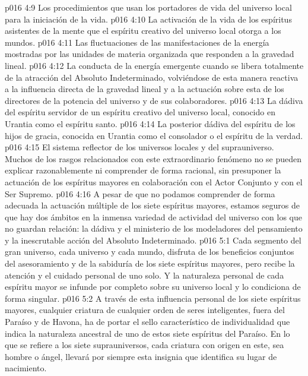 \vs p016 4:9 Los procedimientos que usan los portadores de vida del universo local para la iniciación de la vida.
\vs p016 4:10 La activación de la vida de los espíritus asistentes de la mente que el espíritu creativo del universo local otorga a los mundos.
\vs p016 4:11 Las fluctuaciones de las manifestaciones de la energía mostradas por las unidades de materia organizada que responden a la gravedad lineal.
\vs p016 4:12 La conducta de la energía emergente cuando se libera totalmente de la atracción del Absoluto Indeterminado, volviéndose de esta manera reactiva a la influencia directa de la gravedad lineal y a la actuación sobre esta de los directores de la potencia del universo y de sus colaboradores.
\vs p016 4:13 La dádiva del espíritu servidor de un espíritu creativo del universo local, conocido en Urantia como el espíritu santo.
\vs p016 4:14 La posterior dádiva del espíritu de los hijos de gracia, conocida en Urantia como el consolador o el espíritu de la verdad.
\vs p016 4:15 El sistema reflector de los universos locales y del suprauniverso. Muchos de los rasgos relacionados con este extraordinario fenómeno no se pueden explicar razonablemente ni comprender de forma racional, sin presuponer la actuación de los espíritus mayores en colaboración con el Actor Conjunto y con el Ser Supremo.
\vs p016 4:16 \pc A pesar de que no podamos comprender de forma adecuada la actuación múltiple de los siete espíritus mayores, estamos seguros de que hay dos ámbitos en la inmensa variedad de actividad del universo con los que no guardan relación: la dádiva y el ministerio de los modeladores del pensamiento y la inescrutable acción del Absoluto Indeterminado.
\vs p016 5:1 Cada segmento del gran universo, cada universo y cada mundo, disfruta de los beneficios conjuntos del asesoramiento y de la sabiduría de los siete espíritus mayores, pero recibe la atención y el cuidado personal de uno solo. Y la naturaleza personal de cada espíritu mayor se infunde por completo sobre su universo local y lo condiciona de forma singular.
\vs p016 5:2 A través de esta influencia personal de los siete espíritus mayores, cualquier criatura de cualquier orden de seres inteligentes, fuera del Paraíso y de Havona, ha de portar el sello característico de individualidad que indica la naturaleza ancestral de uno de estos siete espíritus del Paraíso. En lo que se refiere a los siete suprauniversos, cada criatura con origen en este, sea hombre o ángel, llevará por siempre esta insignia que identifica su lugar de nacimiento.
